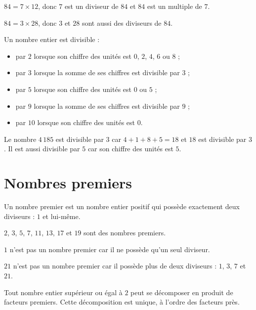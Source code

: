 \documentclass[a4paper,10pt]{report}
\begin{document}
\begin{ex}
$84=7\times 12$, donc $7$ est un diviseur de $84$ et $84$ est un multiple de $7$.

\medskip
$84=3\times 28$, donc $3$ et $28$ sont aussi des diviseurs de $84$.
\end{ex}

\begin{prop}
Un nombre entier est divisible :
\begin{itemize}
\item par $2$ lorsque son chiffre des unités est $0$, $2$, $4$, $6$ ou $8$ ;
\item par $3$ lorsque la somme de ses chiffres est divisible par $3$ ;
\item par $5$ lorsque son chiffre des unités est $0$ ou $5$ ;
\item par $9$ lorsque la somme de ses chiffres est divisible par $9$ ;
\item par $10$ lorsque son chiffre des unités est $0$.
\end{itemize}
\end{prop}

\begin{ex}
Le nombre $4\,185$ est divisible par $3$ car $4+1+8+5=18$ et $18$ est divisible par $3$.
Il est aussi divisible par $5$ car son chiffre des unités est $5$.
\end{ex}

\section{Nombres premiers}

\begin{defn}
Un nombre premier est un nombre entier positif qui possède exactement deux diviseurs : $1$ et lui-même.
\end{defn}

\begin{ex}
$2$, $3$, $5$, $7$, $11$, $13$, $17$ et $19$ sont des nombres premiers.

\medskip
$1$ n'est pas un nombre premier car il ne possède qu'un seul diviseur.

\medskip
$21$ n'est pas un nombre premier car il possède plus de deux diviseurs : $1$, $3$, $7$ et $21$.
\end{ex}

\begin{thm}
Tout nombre entier supérieur ou égal à $2$ peut se décomposer en produit de facteurs premiers.
Cette décomposition est unique, à l'ordre des facteurs près.
\end{thm}
\end{document}
